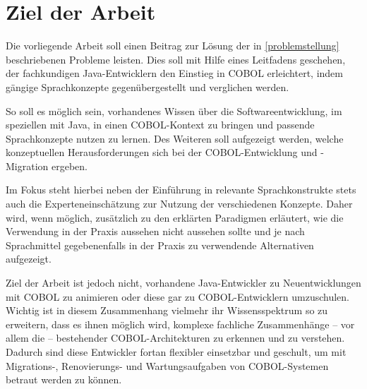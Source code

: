 \section{Ziel der Arbeit}
Die vorliegende Arbeit soll einen Beitrag zur Lösung der in \autoref{problemstellung} beschriebenen Probleme leisten. Dies soll mit Hilfe eines Leitfadens geschehen, der fachkundigen Java-Entwicklern den Einstieg in COBOL erleichtert, indem gängige Sprachkonzepte gegenübergestellt und verglichen werden. 

So soll es möglich sein, vorhandenes Wissen über die Softwareentwicklung, im speziellen mit Java, in einen COBOL-Kontext zu bringen und passende Sprachkonzepte nutzen zu lernen. Des Weiteren soll aufgezeigt werden, welche konzeptuellen Herausforderungen sich bei der COBOL-Entwicklung und -Migration ergeben.

Im Fokus steht hierbei neben der Einführung in relevante Sprachkonstrukte stets auch die Experteneinschätzung zur Nutzung der verschiedenen Konzepte. Daher wird, wenn möglich, zusätzlich zu den erklärten Paradigmen erläutert, wie die Verwendung in der Praxis aussehen \bzw nicht aussehen sollte und je nach Sprachmittel gegebenenfalls in der Praxis zu verwendende Alternativen aufgezeigt.

Ziel der Arbeit ist jedoch nicht, vorhandene Java-Entwickler zu Neuentwicklungen mit COBOL zu animieren oder diese gar zu COBOL-Entwicklern umzuschulen. Wichtig ist in diesem Zusammenhang vielmehr ihr Wissensspektrum so zu erweitern, dass es ihnen möglich wird, komplexe fachliche Zusammenhänge -- vor allem die  -- bestehender COBOL-Architekturen zu erkennen und zu verstehen. Dadurch sind diese Entwickler fortan flexibler einsetzbar und geschult, um mit Migrations-, Renovierungs- und Wartungsaufgaben von COBOL-Systemen betraut werden zu können.